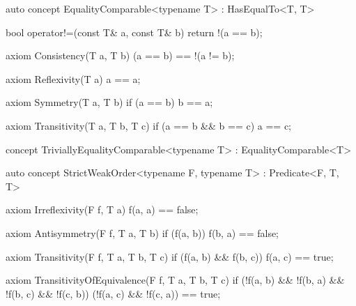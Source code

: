\documentclass[american,twoside]{book}
\begin{document}
\begin{itemdecl}
auto concept EqualityComparable<typename T> : HasEqualTo<T, T> {
  bool operator!=(const T& a, const T& b) { return !(a == b); }

  axiom Consistency(T a, T b) {
    (a == b) == !(a != b);
  }

  axiom Reflexivity(T a) { a == a; }

  axiom Symmetry(T a, T b) { 
    if (a == b) 
      b == a; 
  }

  axiom Transitivity(T a, T b, T c) {
    if (a == b && b == c) 
      a == c;
  }
}
\end{itemdecl}

\begin{itemdescr}
\pnum
{}
\end{itemdescr}

\begin{itemdecl}
concept TriviallyEqualityComparable<typename T> : EqualityComparable<T> { }
\end{itemdecl}

\begin{itemdescr}
\pnum 
{}

\pnum
{}
\end{itemdescr}

\begin{itemdecl}
auto concept StrictWeakOrder<typename F, typename T> : Predicate<F, T, T> {

  axiom Irreflexivity(F f, T a) { f(a, a) == false; }

  axiom Antisymmetry(F f, T a, T b) { 
    if (f(a, b)) 
      f(b, a) == false;
  }

  axiom Transitivity(F f, T a, T b, T c) {
    if (f(a, b) && f(b, c)) 
      f(a, c) == true;
  }

  axiom TransitivityOfEquivalence(F f, T a, T b, T c) {
    if (!f(a, b) && !f(b, a) && !f(b, c) && !f(c, b))
      (!f(a, c) && !f(c, a)) == true;
  }
}
\end{itemdecl}
\end{document}
